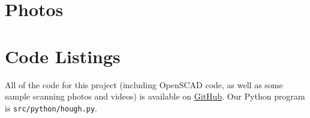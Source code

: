 \documentclass[12pt, letterpaper]{article}
\begin{document}
\appendix
\section{Photos}

\section{Code Listings}
All of the code for this project (including OpenSCAD code, as well as some sample
scanning photos and videos) is available on
\href{https://github.com/nhalford/3d-scanner/}{GitHub}. Our Python program is 
\texttt{src/python/hough.py}.
\end{document}
